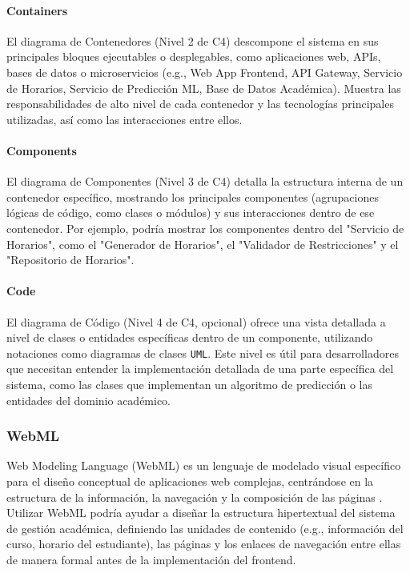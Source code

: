 \paragraph{Containers}
El diagrama de Contenedores (Nivel 2 de C4) descompone el sistema en sus principales bloques ejecutables o desplegables, como aplicaciones web, APIs, bases de datos o microservicios (e.g., Web App Frontend, API Gateway, Servicio de Horarios, Servicio de Predicción ML, Base de Datos Académica). Muestra las responsabilidades de alto nivel de cada contenedor y las tecnologías principales utilizadas, así como las interacciones entre ellos.

\paragraph{Components}
El diagrama de Componentes (Nivel 3 de C4) detalla la estructura interna de un contenedor específico, mostrando los principales componentes (agrupaciones lógicas de código, como clases o módulos) y sus interacciones dentro de ese contenedor. Por ejemplo, podría mostrar los componentes dentro del "Servicio de Horarios", como el "Generador de Horarios", el "Validador de Restricciones" y el "Repositorio de Horarios".

\paragraph{Code}
El diagrama de Código (Nivel 4 de C4, opcional) ofrece una vista detallada a nivel de clases o entidades específicas dentro de un componente, utilizando notaciones como diagramas de clases \texttt{UML}. Este nivel es útil para desarrolladores que necesitan entender la implementación detallada de una parte específica del sistema, como las clases que implementan un algoritmo de predicción o las entidades del dominio académico.

\subsubsection{WebML}
Web Modeling Language (WebML) es un lenguaje de modelado visual específico para el diseño conceptual de aplicaciones web complejas, centrándose en la estructura de la información, la navegación y la composición de las páginas \parencite{Ceri2000}. Utilizar WebML podría ayudar a diseñar la estructura hipertextual del sistema de gestión académica, definiendo las unidades de contenido (e.g., información del curso, horario del estudiante), las páginas y los enlaces de navegación entre ellas de manera formal antes de la implementación del frontend.

